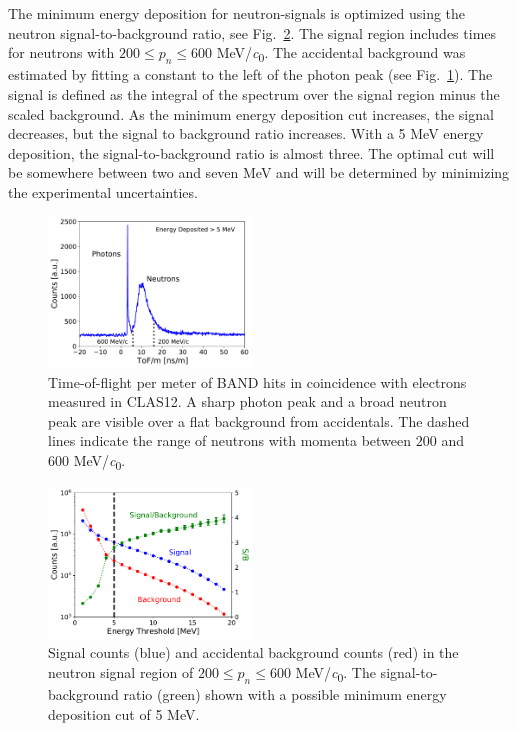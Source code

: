 \documentclass[3p,twocolumn]{elsarticle}
\begin{document}
The minimum energy deposition for neutron-signals is optimized using the neutron
signal-to-background ratio, see Fig.~\ref{fig:signalbackground}. The
signal region includes times for neutrons with $200\le p_n \le600$
\si{\MeV/\clight}. The accidental background was estimated by
fitting a constant to the left of the photon peak (see
Fig.~\ref{fig:tof}). The signal is defined as the integral of the
spectrum over the signal region minus the scaled background.  
As the minimum energy deposition cut increases, the signal decreases,
but the signal to background ratio increases.  
With a 5 \si{\MeV} energy deposition,
the signal-to-background ratio is almost three. The optimal cut will
be somewhere between two and seven \si{\MeV} and will be determined by
minimizing the experimental uncertainties.
\begin{figure}[th!]
	\centering
		\includegraphics[width=0.48\textwidth]{fig23-performance.pdf}
                \caption{Time-of-flight per meter of BAND hits in
                  coincidence with electrons measured in
                  CLAS12. A sharp photon peak and a broad neutron peak are visible
                  over a flat background from accidentals. The dashed
                  lines indicate the range of neutrons with momenta
                  between $200$ and $600$ \si{\MeV/\clight}.}
	\label{fig:tof}
\end{figure}

\begin{figure}[th!]
	\centering
		\includegraphics[width=0.48\textwidth]{fig24-spb.pdf}
	\caption{Signal counts (blue) and accidental background counts
          (red) in the neutron signal region of $200 \le p_n \le 600$ \si{\MeV/\clight}. The signal-to-background ratio (green) shown with a possible minimum energy deposition cut of 5 \si{\MeV}.}
	\label{fig:signalbackground}
\end{figure}
\end{document}

